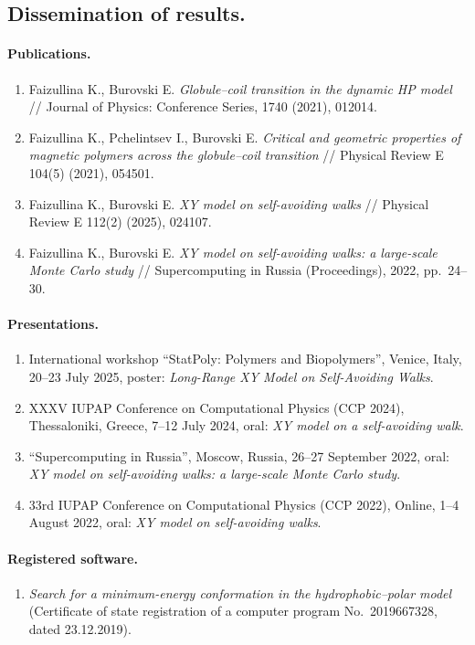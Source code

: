\subsection*{Dissemination of results.}

\paragraph*{Publications.}

\begin{enumerate}
	\item Faizullina K., Burovski E. \emph{Globule--coil transition in the dynamic HP model} //
	Journal of Physics: Conference Series, 1740 (2021), 012014.
	\item Faizullina K., Pchelintsev I., Burovski E. \emph{Critical and geometric properties
		of magnetic polymers across the globule--coil transition} // Physical Review E 104(5) (2021), 054501.
	\item Faizullina K., Burovski E. \emph{XY model on self-avoiding walks} // Physical Review E 112(2) (2025), 024107.
	\item Faizullina K., Burovski E. \emph{XY model on self-avoiding walks: a large-scale Monte Carlo study} // Supercomputing in Russia (Proceedings), 2022, pp.~24--30.
\end{enumerate}


\paragraph*{Presentations.}

\begin{enumerate}
	\item International workshop ``StatPoly: Polymers and Biopolymers'', Venice, Italy, 20--23 July 2025, poster: \emph{Long-Range XY Model on Self-Avoiding Walks}.
	\item XXXV IUPAP Conference on Computational Physics (CCP 2024), Thessaloniki, Greece, 7--12 July 2024, oral: \emph{XY model on a self-avoiding walk}.
	\item ``Supercomputing in Russia'', Moscow, Russia, 26--27 September 2022, oral: \emph{XY model on self-avoiding walks: a large-scale Monte Carlo study}.
	\item 33rd IUPAP Conference on Computational Physics (CCP 2022), Online, 1--4 August 2022, oral: \emph{XY model on self-avoiding walks}.
\end{enumerate}


\paragraph*{Registered software.}

\begin{enumerate}
	\item \emph{Search for a minimum-energy conformation in the hydrophobic--polar model} (Certificate of state registration of a computer program No.~2019667328, dated 23.12.2019).
\end{enumerate}
